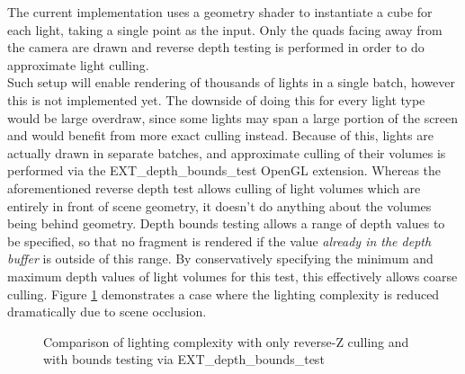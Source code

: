 The current implementation uses a geometry shader to instantiate a cube for each light, taking a single point as the input. Only the quads facing away from the camera are drawn and reverse depth testing is performed in order to do approximate light culling. \\
Such setup will enable rendering of thousands of lights in a single batch, however this is not implemented yet. The downside of doing this for every light type would be large overdraw, since some lights may span a large portion of the screen and would benefit from more exact culling instead. Because of this, lights are actually drawn in separate batches, and approximate culling of their volumes is performed via the EXT\_depth\_bounds\_test OpenGL extension. Whereas the aforementioned reverse depth test allows culling of light volumes which are entirely in front of scene geometry, it doesn't do anything about the volumes being behind geometry. Depth bounds testing allows a range of depth values to be specified, so that no fragment is rendered if the value \emph{already in the depth buffer} is outside of this range. By conservatively specifying the minimum and maximum depth values of light volumes for this test, this effectively allows coarse culling. Figure \ref{fig:lightingComplexityComparison} demonstrates a case where the lighting complexity is reduced dramatically due to scene occlusion.

\begin{figure}[h!]
  \centering
  \caption[Light volume culling comparison]{Comparison of lighting complexity with only reverse-Z culling and with bounds testing via EXT\_depth\_bounds\_test}
  \label{fig:lightingComplexityComparison}
\end{figure}

